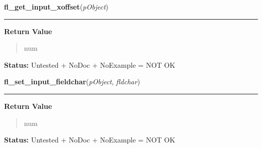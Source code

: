 \hspace{.8\funcindent}\begin{boxedminipage}{\funcwidth}

    \raggedright \textbf{fl\_get\_input\_xoffset}(\textit{pObject})

    \vspace{-1.5ex}

    \rule{\textwidth}{0.5\fboxrule}
\setlength{\parskip}{2ex}
\setlength{\parskip}{1ex}
      \textbf{Return Value}
    \vspace{-1ex}

      \begin{quote}
      num

      \end{quote}

\textbf{Status:} Untested + NoDoc + NoExample = NOT OK



    \end{boxedminipage}

    \label{xformslib:library:fl_set_input_fieldchar}

    \vspace{0.5ex}

\hspace{.8\funcindent}\begin{boxedminipage}{\funcwidth}

    \raggedright \textbf{fl\_set\_input\_fieldchar}(\textit{pObject}, \textit{fldchar})

    \vspace{-1.5ex}

    \rule{\textwidth}{0.5\fboxrule}
\setlength{\parskip}{2ex}
\setlength{\parskip}{1ex}
      \textbf{Return Value}
    \vspace{-1ex}

      \begin{quote}
      num

      \end{quote}

\textbf{Status:} Untested + NoDoc + NoExample = NOT OK



    \end{boxedminipage}

    \label{xformslib:library:fl_get_input_topline}

